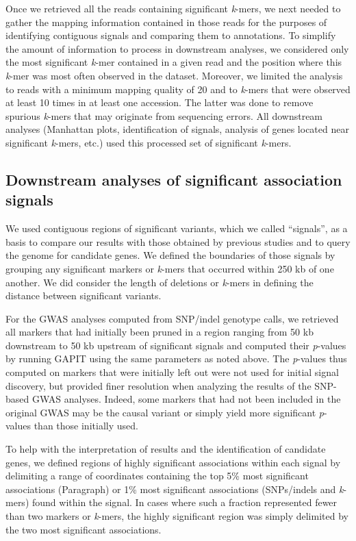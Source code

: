 \documentclass[doublespacing]{bmcart}
\begin{document}
Once we retrieved all the reads containing significant \emph{k}-mers, we next
needed to gather the mapping information contained in those reads for the
purposes of identifying contiguous signals and comparing them to annotations. To
simplify the amount of information to process in downstream analyses, we
considered only the most significant \emph{k}-mer contained in a given read and
the position where this \emph{k}-mer was most often observed in
the dataset. Moreover, we limited the analysis to reads with a minimum mapping
quality of 20 and to \emph{k}-mers that were observed at least 10 times in at
least one accession. The latter was done to remove spurious \emph{k}-mers that may originate
from sequencing errors. All downstream analyses (Manhattan plots,
identification of signals, analysis of genes located near significant
\emph{k}-mers, etc.) used this processed set of significant \emph{k}-mers.

\subsection*{Downstream analyses of significant association signals}

We used contiguous regions of significant variants, which we called
``signals'', as a basis to compare our results with those obtained by previous
studies and to query the genome for candidate genes. We defined the boundaries
of those signals by grouping any significant markers or \emph{k}-mers that
occurred within 250 kb of one another.  We did consider the length of deletions
or \emph{k}-mers in defining the distance between significant variants.

For the GWAS analyses computed from SNP/indel genotype calls, we retrieved all
markers that had initially been pruned in a region ranging from 50 kb
downstream to 50 kb upstream of significant signals and computed their
\emph{p}-values by running GAPIT using the same parameters as noted above. The
\emph{p}-values thus computed on markers that were initially left out were not
used for initial signal discovery, but provided finer resolution when analyzing
the results of the SNP-based GWAS analyses. Indeed, some markers that had not
been included in the original GWAS may be the causal variant or simply yield
more significant \emph{p}-values than those initially used.

To help with the interpretation of results and the identification of candidate
genes, we defined regions of highly significant associations within each signal
by delimiting a range of coordinates containing the top 5\% most significant
associations (Paragraph) or 1\% most significant associations (SNPs/indels
and \emph{k}-mers) found within the signal. In cases where such a fraction
represented fewer than two markers or \emph{k}-mers, the highly significant
region was simply delimited by the two most significant associations.
\end{document}
